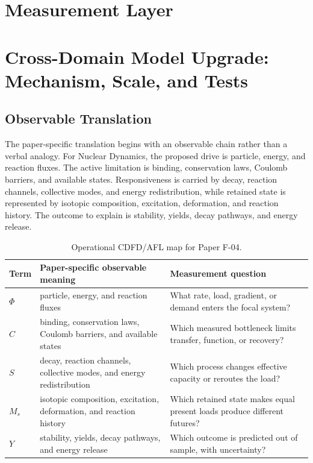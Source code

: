 \documentclass[11pt,a4paper]{article}
\begin{document}
\section{Measurement Layer}

\section{Cross-Domain Model Upgrade: Mechanism, Scale, and Tests}

\subsection{Observable Translation}

The paper-specific translation begins with an observable chain rather than a
verbal analogy. For Nuclear Dynamics, the proposed drive is particle, energy, and reaction fluxes.
The active limitation is binding, conservation laws, Coulomb barriers, and available states. Responsiveness is carried by
decay, reaction channels, collective modes, and energy redistribution, while retained state is represented by
isotopic composition, excitation, deformation, and reaction history. The outcome to explain is stability, yields, decay pathways, and energy release.

\begin{table}[htbp]
\centering
\small
\caption{Operational CDFD/AFL map for Paper F-04.}
\begin{tabularx}{\textwidth}{|l|X|X|}
\hline
\textbf{Term} & \textbf{Paper-specific observable meaning} & \textbf{Measurement question} \\
\hline
$\Phi$ & particle, energy, and reaction fluxes & What rate, load, gradient, or demand enters the focal system? \\
\hline
$C$ & binding, conservation laws, Coulomb barriers, and available states & Which measured bottleneck limits transfer, function, or recovery? \\
\hline
$S$ & decay, reaction channels, collective modes, and energy redistribution & Which process changes effective capacity or reroutes the load? \\
\hline
$M_s$ & isotopic composition, excitation, deformation, and reaction history & Which retained state makes equal present loads produce different futures? \\
\hline
$Y$ & stability, yields, decay pathways, and energy release & Which outcome is predicted out of sample, with uncertainty? \\
\hline
\end{tabularx}
\end{table}
\end{document}
